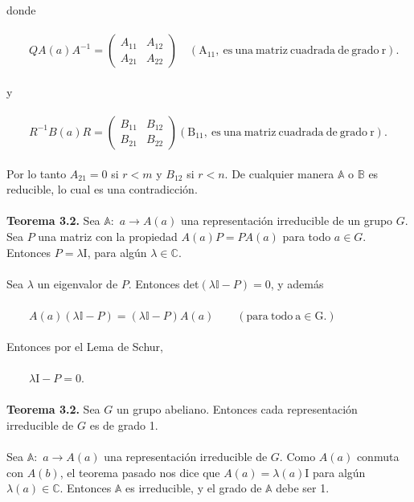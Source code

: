 \documentclass[12pt]{book}
\theoremstyle{definition}
\newcounter{in}
\begin{document}
donde \\~\\
$\qquad
QA(a)A^{-1}=
\begin{pmatrix}
A_{11} & A_{12} \\ 
A_{21} & A_{22}
\end{pmatrix} \quad \mathrm{(A_{11},\ es\ una\ matriz\ cuadrada\ de\ grado\ r).\ }$\\~\\
y \\~\\
$\qquad
R^{-1}B(a)R=
\begin{pmatrix}
B_{11} & B_{12} \\ 
B_{21} & B_{22}
\end{pmatrix} \mathrm{(B_{11},\ es\ una\ matriz\ cuadrada\ de\ grado\ r).\ }$\\~\\
Por lo tanto $A_{21}=0$ si $r<m$ y $B_{12}$ si $r<n$. De cualquier manera $\mathbb{A}$ o $\mathbb{B}$ es reducible, lo cual es una contradicción.\\~\\
\textbf{Teorema 3.2.} Sea $\mathbb{A}:$ $a\rightarrow A\left(a\right)$ una representación irreducible de un grupo $G$. Sea $P$ una matriz con la propiedad $A(a)P=PA(a)$ para todo $a \in G$. Entonces $P=\lambda \mathrm{I}$, para algún $\lambda \in \mathbb{C}$.\\~\\
Sea $\lambda$ un eigenvalor de $P$. Entonces det$(\lambda \mathbb{I} - P)=0$, y además\\~\\
$\qquad A(a)(\lambda \mathbb{I} - P)=(\lambda \mathbb{I} - P)A(a) \qquad \mathrm{(para\ todo\ a \in G.)}$\\~\\
Entonces por el Lema de Schur,\\~\\
$\qquad \lambda \mathrm{I}-P=0$.\\~\\
\textbf{Teorema 3.2.} Sea $G$ un grupo abeliano. Entonces cada representación irreducible de $G$ es de grado 1.\\~\\
Sea $\mathbb{A}:$ $a\rightarrow A\left(a\right)$ una representación irreducible de $G$. Como $A(a)$ conmuta con $A(b)$, el teorema pasado nos dice que $A(a)=\lambda(a) \mathrm{I}$ para algún $\lambda(a) \in \mathbb{C}$. Entonces $\mathbb{A}$ es irreducible, y el grado de $\mathbb{A}$ debe ser 1.\\~\\
\end{document}
